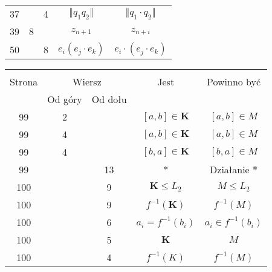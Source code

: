 \documentclass[a4paper,11pt]{article}
\begin{document}
\begin{center}
\begin{tabular}{|c|c|c|c|c|}
    37  & &  4 & $\Vert q_{ 1 } q_{ 2 } \Vert$ & $\Vert q_{ 1 } \cdot q_{ 2 } \Vert$ \\
    39  &  8 & & $z_{ n + 1 }$ & $z_{ n + i }$ \\
    50  & &  8 & $e_{ i } ( e_{ j } \cdot e_{ k } )$
           & $e_{ i } \cdot ( e_{ j } \cdot e_{ k } )$ \\
    \hline
  \end{tabular}





  \newpage

  \begin{tabular}{|c|c|c|c|c|}
    \hline
    & \multicolumn{2}{c|}{} & & \\
    Strona & \multicolumn{2}{c|}{Wiersz} & Jest
                              & Powinno być \\ \cline{2-3}
    & Od góry & Od dołu & & \\
    \hline
    99  &  2 & & $[ a, b ] \in \mathbf{K}$ & $[ a, b ] \in M$ \\
    99  &  4 & & $[ a, b ] \in \mathbf{K}$ & $[ a, b ] \in M$ \\
    99  &  4 & & $[ b, a ] \in \mathbf{K}$ & $[ b, a ] \in M$ \\
    99  & & 13 & $*$ & Działanie $*$ \\
    100 & &  9 & $\mathbf{K} \leq L_{ 2 }$ & $M \leq L_{ 2 }$ \\
    100 & &  9 & $f^{ -1 }( \mathbf{K} )$ & $f^{ - 1}( M )$ \\
    100 & &  6 & $a_{ i } = f^{ -1 }( b_{ i } )$
           & $a_{ i } \in f^{ -1 }( b_{ i } )$ \\
    100 & &  5 & $\mathbf{K}$ & $M$ \\
    100 & &  4 & $f^{ -1 }( K )$ & $f^{ -1 }( M )$ \\
    \hline
  \end{tabular}

\end{center}
\end{document}
